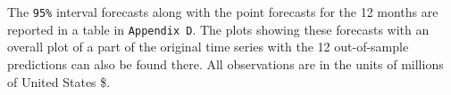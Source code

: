 \documentclass[12pt]{article}
\begin{document}
The \texttt{95\%} interval forecasts along with the point forecasts for the 12 months are reported in a table in \texttt{Appendix D}. The plots showing these forecasts  with an overall plot of a part of the original time series with the 12 out-of-sample predictions can also be found there. All observations are in the units of millions of United States \$.


\begin{center}
        \printbibliography
\end{center}

\pagebreak

\begin{center}
        \Large{}
\end{center}

\bigskip\bigskip

\begin{center}
        \Large{}
\end{center}

\bigskip\bigskip

\begin{center}
        \Large{}
\end{center}

\bigskip\bigskip

\begin{center}
        \Large{}
\end{center}
\end{document}
